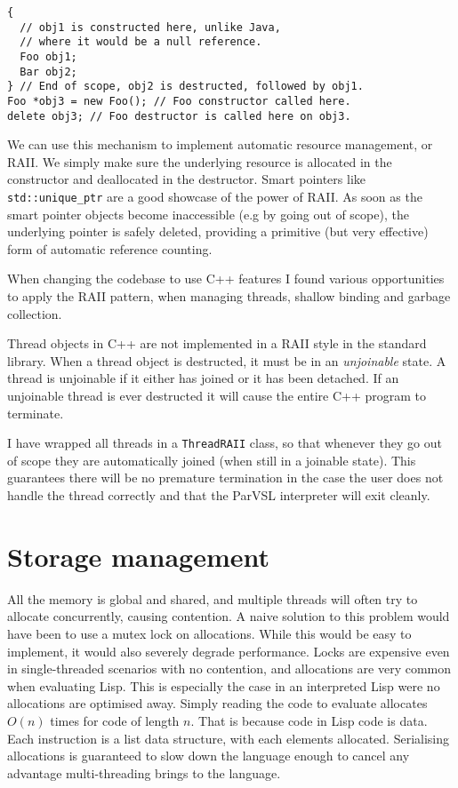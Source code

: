 \begin{verbatim}
{
  // obj1 is constructed here, unlike Java,
  // where it would be a null reference.
  Foo obj1;
  Bar obj2;
} // End of scope, obj2 is destructed, followed by obj1.
Foo *obj3 = new Foo(); // Foo constructor called here.
delete obj3; // Foo destructor is called here on obj3.
\end{verbatim}

We can use this mechanism to implement automatic resource management, or RAII. We simply make sure
the underlying resource is allocated in the constructor and deallocated in the destructor.
Smart pointers like \texttt{std::unique\_ptr} are a good showcase of the power of RAII. As soon as the
smart pointer objects become inaccessible (e.g by going out of scope), the underlying pointer
is safely deleted, providing a primitive (but very effective) form of automatic reference counting.

When changing the codebase to use C++ features I found various opportunities to apply the RAII pattern,
when managing threads, shallow binding and garbage collection.

Thread objects in C++ are not implemented in a RAII style in the standard library. When a thread object
is destructed, it must be in an \emph{unjoinable} state. A thread is unjoinable if it either has joined or
it has been detached. If an unjoinable thread is ever destructed it will cause the entire C++ program to
terminate.

I have wrapped all threads in a \texttt{ThreadRAII} class, so that whenever they go out of scope they are automatically
joined (when still in a joinable state). This guarantees there will be no premature termination in the case the
user does not handle the thread correctly and that the ParVSL interpreter will exit cleanly.


\section{Storage management}
\label{sec:storage}
All the memory is global and shared, and multiple threads will often try
to allocate concurrently, causing contention. A naive solution to this problem
would have been to use a mutex lock on allocations. While this would be easy to
implement, it would also severely degrade performance. Locks are expensive even
in single-threaded scenarios with no contention, and allocations are very common
when evaluating Lisp. This is especially the case in an interpreted Lisp were no
allocations are optimised away. Simply reading the code to evaluate allocates
\(O(n)\) times for code of length \(n\). That is because code in Lisp code is data.
Each instruction is a list data structure, with each elements allocated.
Serialising allocations is guaranteed to slow down the language enough to cancel
any advantage multi-threading brings to the language.

